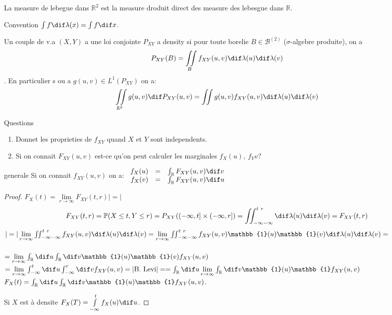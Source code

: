 \begin{definition}
	La measure de lebegue dans $\mathbb{R}^2$ est la measure droduit direct des measure des lebesgue dans $\mathbb{R}$.
\end{definition}

Convention $\int f\dif \lambda(x)=\int f \dif x$.

\begin{definition}
	Un couple de v.a $(X, Y)$ a une loi conjointe $P_{XY}$ a density si pour toute borelie $B\in\mathcal{B}^{(2)}$ ($\sigma$-algebre produite), on a
	$$P_{XY}(B)=\iint\limits_{B}f_{XY}(u, v)\dif\lambda(u)\dif\lambda(v)$$. En particulier s ou a $g(u,v)\in L^1(P_{XY})$ on a:
	$$\iint\limits_{\mathbb{R}^2}g(u, v)\dif P_{XY}(u, v)=\iint g(u,v) f_{XY}(u, v)\dif \lambda(u) \dif \lambda(v)$$
\end{definition}

Questions
\begin{enumerate}
	\item Donnet les proprieties de $f_{XY}$ quand $X$ et $Y$ sont independents.
	\item Si on connait $F_{XY}(u, v)$ est-ce qu'on peut calculer les marginales $f_X(u),\ f_Y{v}$?
\end{enumerate}

\begin{proposition}{generale}
	Si on connait $f_{XY}(u, v)$ on a:
	$\begin{array}{rrl}f_X(u) & = & \int_\mathbb{R}F_{XY}(u,v)\dif v\\ f_X(v) & = & \int_\mathbb{R}F_{XY}(u,v)\dif u\end{array}$
\end{proposition}
\begin{proof}
	$F_X(t)=\lim\limits_{r\rightarrow\infty}F_{XY}(t, r)|=|$\\
	$$F_{XY}(t,r)=\mathbb{P}(X\leq t, Y\leq r)=P_{XY}((-\infty, t]\times(-\infty, r])=\iint_{-\infty -\infty}^{t\ r}\dif \lambda(u) \dif \lambda(v)=F_{XY}(t,r)$$
	$|=|\lim\limits_{r\rightarrow\infty}\iint_{-\infty -\infty}^{t\ r} f_{XY}(u, v)\dif \lambda(u) \dif \lambda(v)=\lim\limits_{r\rightarrow\infty}\iint_{-\infty -\infty}^{t\ r} f_{XY}(u, v)\mathbb{1}(u)\mathbb{1}(v)\dif \lambda(u) \dif \lambda(v)=$\\
	\\
	$=\lim\limits_{r\rightarrow\infty}\int_{\mathbb{R}} \dif u \int_{\mathbb{R}} \dif v \mathbb{1}(u)\mathbb{1}(v) f_{XY}(u, v)$
	$=\lim\limits_{r\rightarrow\infty}\int_{-\infty}^t \dif u \int_{-\infty}^r \dif v  f_{XY}(u, v) =|\text{B. Levi}|=
	=\int_{\mathbb{R}} \dif u \lim\limits_{r\rightarrow\infty} \int_{\mathbb{R}} \dif v \mathbb{1}(u)\mathbb{1} f_{XY}(u, v)$
	$F_X(t)=\int_{\mathbb{R}} \dif u \int_{\mathbb{R}} \dif v \mathbb{1}(u)\mathbb{1} f_{XY}(u, v)$.
	
	Si $X$ est à densite $F_X(T) = \int\limits_{-\infty}^t f_X(u) \dif u$.
\end{proof}

